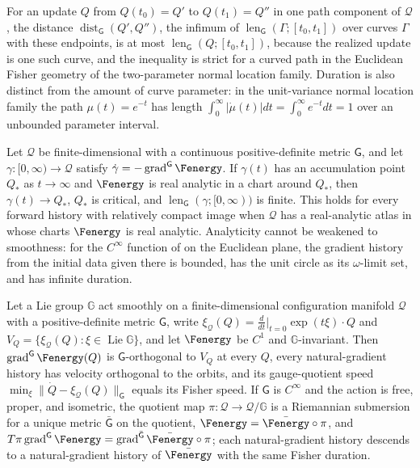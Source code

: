 For an update $Q$ from $Q(t_0)=Q'$ to $Q(t_1)=Q''$ in one path component of
$\mathcal Q$, the distance $\operatorname{dist}_{\mathsf G}(Q',Q'')$, the infimum of
$\operatorname{len}_{\mathsf G}(\Gamma;[t_0,t_1])$ over curves $\Gamma$ with these
endpoints, is at most $\operatorname{len}_{\mathsf G}(Q;[t_0,t_1])$, because the realized
update is one such curve, and the inequality is strict for a curved path in the Euclidean
Fisher geometry of the two-parameter normal location family.  Duration is also distinct
from the amount of curve parameter: in the unit-variance normal location family the path
$\mu(t)=e^{-t}$ has length $\int_0^\infty|\dot\mu(t)|dt=\int_0^\infty e^{-t}dt=1$ over an
unbounded parameter interval.  

Let $\mathcal Q$ be finite-dimensional with a continuous positive-definite metric
$\mathsf G$, and let $\gamma:[0,\infty)\to\mathcal Q$ satisfy
$\dot\gamma=-\operatorname{grad}^{\mathsf G}\Fenergy$.  If $\gamma(t)$ has an
accumulation point $Q_*$ as $t\to\infty$ and $\Fenergy$ is real analytic in a chart
around $Q_*$, then $\gamma(t)\to Q_*$, $Q_*$ is critical, and
$\operatorname{len}_{\mathsf G}(\gamma;[0,\infty))$ is finite.  This holds for every
forward history with relatively compact image when $\mathcal Q$ has a real-analytic atlas
in whose charts $\Fenergy$ is real analytic.  Analyticity cannot be weakened to
smoothness: for the $C^\infty$ function of \citet[Section~2, Eq.~(8)]{absil2005convergence}
on the Euclidean plane, the gradient history from the initial data given there is
bounded, has the unit circle as its $\omega$-limit set, and has infinite duration.

Let a Lie group $\mathbb G$ act smoothly on a finite-dimensional configuration manifold
$\mathcal Q$ with a positive-definite metric $\mathsf G$, write
$\xi_{\mathcal Q}(Q)=\tfrac{d}{dt}\big|_{t=0}\exp(t\xi)\cdot Q$ and
$V_Q=\{\xi_{\mathcal Q}(Q):\xi\in\operatorname{Lie}\mathbb G\}$, and let $\Fenergy$ be
$C^1$ and $\mathbb G$-invariant.  Then $\operatorname{grad}^{\mathsf G}\Fenergy(Q)$ is
$\mathsf G$-orthogonal to $V_Q$ at every $Q$, every natural-gradient history has velocity
orthogonal to the orbits, and its gauge-quotient speed
$\min_{\xi}\lVert\dot Q-\xi_{\mathcal Q}(Q)\rVert_{\mathsf G}$ equals its Fisher speed.
If $\mathsf G$ is $C^\infty$ and the action is free, proper, and isometric, the quotient
map $\pi:\mathcal Q\to\mathcal Q/\mathbb G$ is a Riemannian submersion for a unique
metric $\bar{\mathsf G}$ on the quotient, $\Fenergy=\bar\Fenergy\circ\pi$, and
$T\pi\operatorname{grad}^{\mathsf G}\Fenergy=\operatorname{grad}^{\bar{\mathsf
G}}\bar\Fenergy\circ\pi$; each natural-gradient history descends to a natural-gradient
history of $\bar\Fenergy$ with the same Fisher duration.  

